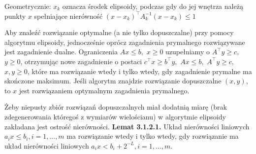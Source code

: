 \documentclass[licencjacka]{pracamgr}
\begin{document}
Geometrycznie: $x_k$ oznacza środek elipsoidy, podczas gdy do jej wnętrza należą punkty $x$ spełniające nierówność $(x-x_k)^{\top}A_k^{-1}(x-x_k)\le1$

Aby znaleźć rozwiązanie optymalne (a nie tylko dopuszczalne) przy pomocy algorytmu elipsoidy, jednocześnie oprócz zagadnienia prymalnego rozwiązywane jest zagadnienie dualne.
Ograniczenia $Ax\le b,$ $x\ge0$ uzupełniamy o $A^{\top}y\ge c,$ $y\ge0$, otrzymując nowe zagadnienie o postaci $c^{\top}x\ge b^{\top}y,$ $Ax\le b,$ $A^{\top}y\ge c,$ $x,y\ge0$, które ma rozwiązanie
wtedy i tylko wtedy, gdy zagadnienie prymalne ma skończone maksimum. Jeśli algorytm znajdzie rozwiązanie dopuszczalne $(x,y)$, to $x$ jest rozwiązaniem optymalnym zagadnienia prymalnego.

Żeby niepusty zbiór rozwiązań dopuszczalnych miał dodatnią miarę (brak zdegenerowania któregoś z wymiarów wielościanu) w algorytmie elipsoidy zakładana jest ostrość nierówności.\newline\newline
%
\textbf{Lemat 3.1.2.1.} Układ nierówności liniowych $a_ix\le b_i, i=1,...,m$ ma rozwiązanie wtedy i tylko wtedy, gdy rozwiązanie ma układ nierówności liniowych $a_ix<b_i+2^{-L}, i=1,...,m$.
\end{document}
